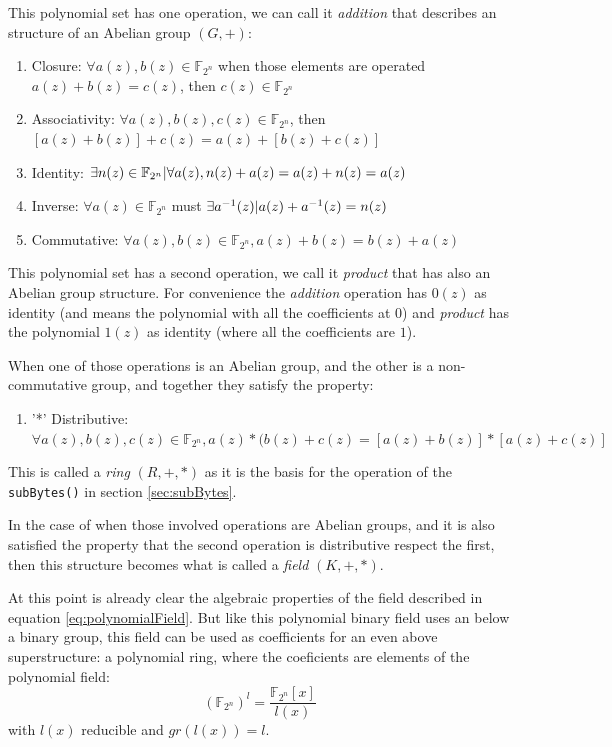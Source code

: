 \documentclass[10pt,a4paper,twoside]{llncs}
\newcommand{\Fpn}[2]{\ensuremath{\mathbb{F}_{#1^#2}}}
\begin{document}
This polynomial set has one operation, we can call it \emph{addition} that describes an structure of an Abelian group $(G,+)$:
\begin{enumerate}
 \item Closure: $\forall a(z),b(z) \in \Fpn{2}{n}$ when those elements are operated $a(z)+b(z)=c(z)$, then $c(z) \in \Fpn{2}{n}$
 \item Associativity: $\forall a(z),b(z),c(z) \in \Fpn{2}{n}$, then $[a(z)+b(z)]+c(z)=a(z)+[b(z)+c(z)]$
 \item Identity: $\exists n(z) \in \Fpn{2}{n} \arrowvert \forall a(z), n(z)+a(z)=a(z)+n(z)=a(z)$
 \item Inverse: $\forall a(z) \in \Fpn{2}{n}$ must $\exists a^{-1}(z) \arrowvert a(z)+a^{-1}(z) = n(z)$
 \item Commutative: $\forall a(z),b(z) \in \Fpn{2}{n}, a(z)+b(z)=b(z)+a(z)$
\end{enumerate}

This polynomial set has a second operation, we call it \emph{product} that has also an Abelian group structure. For convenience the \emph{addition} operation has $0(z)$ as identity (and means the polynomial with all the coefficients at $0$) and \emph{product} has the polynomial $1(z)$ as identity (where all the coefficients are $1$).

When one of those operations is an Abelian group, and the other is a non-commutative group, and together they satisfy the property:
\begin{enumerate}
 \item '*' Distributive: $\forall a(z),b(z),c(z) \in \Fpn{2}{n}, a(z)*(b(z)+c(z)=[a(z)+b(z)]*[a(z)+c(z)]$
\end{enumerate}
This is called a \emph{ring} $(R,+,*)$ as it is the basis for the operation of the {\tt subBytes()} in section \ref{sec:subBytes}.

In the case of when those involved operations are Abelian groups, and it is also satisfied the property that the second operation is distributive respect the first, then this structure becomes what is called a \emph{field} $(K,+,*)$.

At this point is already clear the algebraic properties of the field described in equation \ref{eq:polynomialField}. But like this polynomial binary field uses an below a binary group, this field can be used as coefficients for an even above superstructure: a polynomial ring, where the coeficients are elements of the polynomial field:
\begin{equation}\label{eq:polynomialRing}
    (\Fpn{2}{n})^l=\frac{\Fpn{2}{n}[x]}{l(x)}
\end{equation}
with $l(x)$ reducible and $gr(l(x))=l$.
\end{document}
